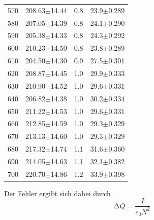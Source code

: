 \begin{table} [h]
\begin{tabular}{S[table-format=4.2]ccc}
		570 &208.63$\pm$14.44& 0.8&23.9$\pm$0.289\\
		580 &207.05$\pm$14.39& 0.8&24.1$\pm$0.290\\
		590 &205.38$\pm$14.33& 0.8&24.3$\pm$0.292\\
		600 &210.23$\pm$14.50& 0.8&23.8$\pm$0.289\\
		610 &204.50$\pm$14.30& 0.9&27.5$\pm$0.301\\
		620 &208.87$\pm$14.45& 1.0&29.9$\pm$0.333\\
		630 &210.90$\pm$14.52& 1.0&29.6$\pm$0.331\\
		640 &206.82$\pm$14.38& 1.0&30.2$\pm$0.334\\
		650 &211.22$\pm$14.53& 1.0&29.6$\pm$0.331\\
		660 &212.85$\pm$14.59& 1.0&29.3$\pm$0.329\\
		670 &213.13$\pm$14.60& 1.0&29.3$\pm$0.329\\
		680 &217.32$\pm$14.74& 1.1&31.6$\pm$0.360\\
		690 &214.05$\pm$14.63& 1.1&32.1$\pm$0.382\\
		700 &220.70$\pm$14.86& 1.2&33.9$\pm$0.398\\
		\bottomrule 
	\end{tabular}
\end{table} 

Der Fehler ergibt sich dabei durch 
\begin{equation*}
	\increment Q = \frac{I}{e_0 N^2}
\end{equation*}
